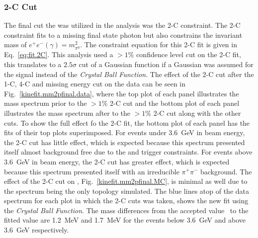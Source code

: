\subsubsection{2-C Cut}
The final cut the was utilized in the analysis was the 2-C constraint. The 2-C constraint fits to a missing final state photon but also constrains the invariant mass of $e^+e^-(\gamma) = m_{\pi^0}^2$. The constraint equation for this 2-C fit is given in Eq.~\ref{eq:fit.2C}. This analysis used a $>1\%$ confidence level cut on the 2-C fit, this translates to a $2.5\sigma$ cut of a Gaussian function if a Gaussian was assumed for the signal instead of the \emph{Crystal Ball Function}. The effect of the 2-C cut after the 1-C, 4-C and missing energy cut on the data can be seen in Fig.~\ref{kinefit.mm2pfinal.data}, where the top plot of each panel illustrates the mass spectrum prior to the $>1\%$ 2-C cut and the bottom plot of each panel illustrates the mass spectrum after to the $>1\%$ 2-C cut along with the other cuts. To show the full effect fo the 2-C fit, the bottom plot of each panel has the fits of their top plots superimposed. For events under 3.6~GeV in beam energy, the 2-C cut has little effect, which is expected because this spectrum presented itself almost background free due to the  and  trigger constraints. For events above 3.6~GeV in beam energy, the 2-C cut has greater effect, which is expected because this spectrum presented itself with an irreducible $\pi^+\pi^-$ background. The effect of the 2-C cut on , Fig.~\ref{kinefit.mm2pfinal.MC}, is minimal as well due to the \pizT spectrum being the only topology simulated. The blue lines atop of the data spectrum for each plot in which the 2-C cuts was taken, shows the new fit using the \emph{Crystal Ball Function}. The mass differences from the accepted value~\cite{pdg2014} to the fitted value are 1.2~MeV and 1.7~MeV for the events below 3.6~GeV and above 3.6~GeV respectively.
